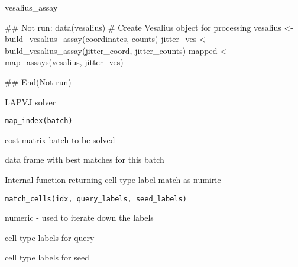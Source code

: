 \documentclass[a4paper]{book}
\begin{document}
%
\begin{Value}
vesalius\_assay
\end{Value}
%
\begin{Examples}
\begin{ExampleCode}
## Not run: 
data(vesalius)
# Create Vesalius object for processing
vesalius <- build_vesalius_assay(coordinates, counts)
jitter_ves <- build_vesalius_assay(jitter_coord, jitter_counts)
mapped <- map_assays(vesalius, jitter_ves)

## End(Not run)
\end{ExampleCode}
\end{Examples}
%
\begin{Description}
LAPVJ solver
\end{Description}
%
\begin{Usage}
\begin{verbatim}
map_index(batch)
\end{verbatim}
\end{Usage}
%
\begin{Arguments}
\begin{ldescription}
\item[\code{batch}] cost matrix batch to be solved
\end{ldescription}
\end{Arguments}
%
\begin{Value}
data frame with best matches for this batch
\end{Value}
%
\begin{Description}
Internal function returning cell type label match as numiric
\end{Description}
%
\begin{Usage}
\begin{verbatim}
match_cells(idx, query_labels, seed_labels)
\end{verbatim}
\end{Usage}
%
\begin{Arguments}
\begin{ldescription}
\item[\code{idx}] numeric - used to iterate down the labels

\item[\code{query\_labels}] cell type labels for query

\item[\code{seed\_labels}] cell type labels for seed
\end{ldescription}
\end{Arguments}
\end{document}
